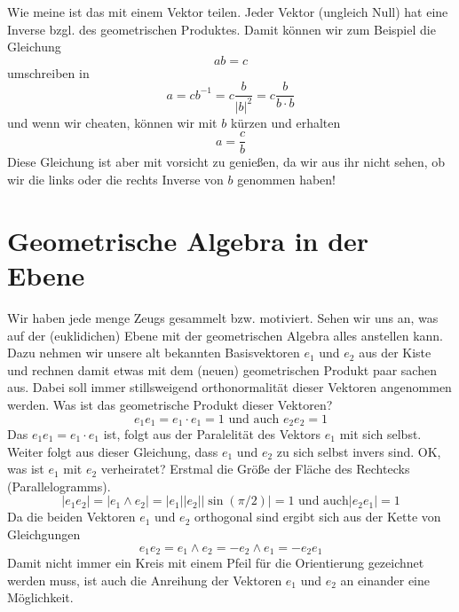 \documentclass[fleqn]{scrartcl}
\numberwithin{equation}{section}
\begin{document}
Wie meine ist das mit einem Vektor teilen. Jeder Vektor (ungleich Null) hat
eine Inverse bzgl. des geometrischen Produktes. Damit können wir zum Beispiel
die Gleichung
\[ab=c\]
umschreiben in
\[a=cb^{-1}=c\frac{b}{|b|^2}=c\frac{b}{b\cdot b}\]
und wenn wir cheaten, können wir mit $b$ kürzen und erhalten
\[a=\frac{c}{b}\]
Diese Gleichung ist aber mit vorsicht zu genießen, da wir aus ihr nicht sehen,
ob wir die links oder die rechts Inverse von $b$ genommen haben!
\section{Geometrische Algebra in der Ebene}
Wir haben jede menge Zeugs gesammelt bzw. motiviert. Sehen wir uns an, was auf
der (euklidichen) Ebene mit der geometrischen Algebra alles anstellen kann.
Dazu nehmen wir unsere alt bekannten Basisvektoren $e_1$ und $e_2$ aus der
Kiste und rechnen damit etwas mit dem (neuen) geometrischen Produkt paar
sachen aus. Dabei soll immer stillsweigend orthonormalität dieser Vektoren
angenommen werden. Was ist das geometrische Produkt dieser Vektoren?
\[e_1e_1=e_1\cdot e_1=1\textrm{ und auch }e_2e_2=1\]
Das $e_1e_1 = e_1\cdot e_1$ ist, folgt aus der Paralelität des Vektors $e_1$
mit sich selbst. Weiter folgt aus dieser Gleichung, dass $e_1$ und $e_2$ zu
sich selbst invers sind. OK, was ist $e_1$ mit $e_2$ verheiratet? Erstmal die
Größe der Fläche des Rechtecks (Parallelogramms).
\[|e_1e_2|=|e_1\wedge e_2|=|e_1||e_2||\sin(\pi/2)|=1\textrm{ und auch
}|e_2e_1|=1\]
Da die beiden Vektoren $e_1$ und $e_2$ orthogonal sind ergibt sich aus der
Kette von Gleichgungen
\[e_1e_2=e_1\wedge e_2 = -e_2\wedge e_1 = -e_2e_1\]
Damit nicht immer ein Kreis mit einem Pfeil für die Orientierung gezeichnet
werden muss, ist auch die Anreihung der Vektoren $e_1$ und $e_2$ an einander
eine Möglichkeit.
\end{document}
